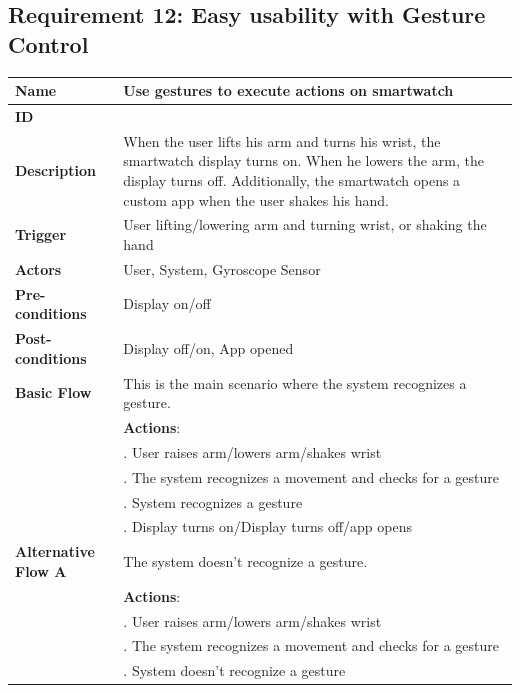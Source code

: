 \documentclass{article}
\begin{document}
	\subsection{Requirement 12: Easy usability with Gesture Control}
		\vspace{1em}
			\begin{center}
			\small
			\begin{tabularx}{1.0\textwidth}{|>{\raggedright\arraybackslash}p{}|>{\raggedright\arraybackslash}X|}
				\hline
				\textbf{Name}               & Use gestures to execute actions on smartwatch \\ \hline
				\textbf{ID}                 & 12 \\ \hline
				\textbf{Description}        & When the user lifts his arm and turns his wrist, the smartwatch display turns on. When he lowers the arm, the display turns off. Additionally, the smartwatch opens a custom app when the user shakes his hand. \\ \hline
				\textbf{Trigger}            & User lifting/lowering arm and turning wrist, or shaking the hand \\ \hline
				\textbf{Actors}             & User, System, Gyroscope Sensor \\ \hline
				\textbf{Pre-conditions}     & Display on/off \\ \hline
				\textbf{Post-conditions}    & Display off/on, App opened \\ \hline
				\textbf{Basic Flow}         & This is the main scenario where the system recognizes a gesture. \\ \hline
											& \textbf{Actions}: \\
											& 1. User raises arm/lowers arm/shakes wrist \\
											& 2. The system recognizes a movement and checks for a gesture \\
											& 3. System recognizes a gesture \\
											& 4. Display turns on/Display turns off/app opens \\ \hline
				\textbf{Alternative Flow A} & The system doesn't recognize a gesture. \\ \hline
											& \textbf{Actions}: \\
											& 1. User raises arm/lowers arm/shakes wrist \\
											& 2. The system recognizes a movement and checks for a gesture \\
											& 3. System doesn't recognize a gesture \\ \hline

\end{tabularx}
\end{center}
\end{document}
